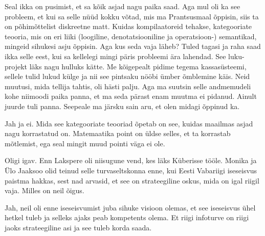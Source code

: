                  
Seal ikka on pusimist, et sa kõik asjad nagu paika saad. Aga mul oli ka see 
probleem, et kui sa selle nüüd kokku võtad, mis ma  Prantsusmaal õppisin, siis 
ta on põhimõttelist diskreetne matt. Kuidas  kompilaatoreid tehakse, 
kategooriate teooria, mis on eri liiki (loogiline, denotatsiooniline ja 
operatsioon-) semantikad, mingeid sihukesi asju õppisin. Aga kus seda vaja 
läheb? Tuled tagasi ja raha saad ikka selle eest, kui sa kellelegi mingi päris 
probleemi ära lahendad. See luku-projekt läks nagu hulluks kätte. Me kõigepealt 
pidime tegema kassasüsteemi, sellele tulid lukud külge ja nii see pintsaku 
nööbi ümber õmblemine käis. Neid muutusi, mida tellija tahtis, oli  hästi 
palju. Aga ma suutsin  selle andmemudeli kohe niimoodi paika panna, et ma seda 
pärast enam muutma ei pidanud. Ainult juurde tuli panna. Seepeale ma järsku 
sain 
aru, et olen midagi õppinud ka.


Jah ja ei. Mida  see kategooriate teooriad õpetab on see, kuidas  maailmas 
asjad nagu korrastatud on. Matemaatika point on üldse selles, et ta korrastab 
mõtlemist, ega seal mingit muud pointi väga ei ole.
                 

Oligi igav. Enn Lakspere oli niisugune vend, kes  
läks Küberisse tööle. Monika ja Ülo Jaaksoo olid 
teinud selle turvaseltskonna enne, kui Eesti Vabariigi iseseisvus paistma 
hakkas, sest nad arvasid, et see on strateegiline oskus, mida on igal riigil 
vaja. Milles on neil õigus.
                 
                 
Jah, neil oli enne iseseisvumist juba sihuke visioon olemas, et see iseseisvus 
ühel hetkel tuleb ja selleks ajaks peab kompetents olema. Et riigi  
infoturve on riigi jaoks strateegiline asi ja see tuleb korda saada.


